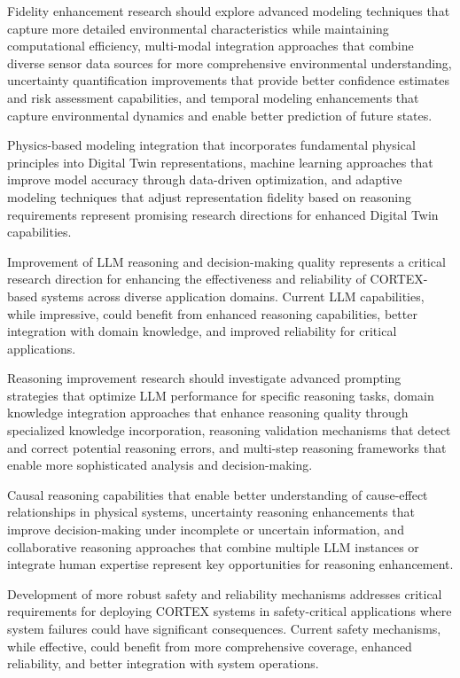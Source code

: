 Fidelity enhancement research should explore advanced modeling techniques that capture more detailed environmental characteristics while maintaining computational efficiency, multi-modal integration approaches that combine diverse sensor data sources for more comprehensive environmental understanding, uncertainty quantification improvements that provide better confidence estimates and risk assessment capabilities, and temporal modeling enhancements that capture environmental dynamics and enable better prediction of future states.

Physics-based modeling integration that incorporates fundamental physical principles into Digital Twin representations, machine learning approaches that improve model accuracy through data-driven optimization, and adaptive modeling techniques that adjust representation fidelity based on reasoning requirements represent promising research directions for enhanced Digital Twin capabilities.

Improvement of LLM reasoning and decision-making quality represents a critical research direction for enhancing the effectiveness and reliability of CORTEX-based systems across diverse application domains. Current LLM capabilities, while impressive, could benefit from enhanced reasoning capabilities, better integration with domain knowledge, and improved reliability for critical applications.

Reasoning improvement research should investigate advanced prompting strategies that optimize LLM performance for specific reasoning tasks, domain knowledge integration approaches that enhance reasoning quality through specialized knowledge incorporation, reasoning validation mechanisms that detect and correct potential reasoning errors, and multi-step reasoning frameworks that enable more sophisticated analysis and decision-making.

Causal reasoning capabilities that enable better understanding of cause-effect relationships in physical systems, uncertainty reasoning enhancements that improve decision-making under incomplete or uncertain information, and collaborative reasoning approaches that combine multiple LLM instances or integrate human expertise represent key opportunities for reasoning enhancement.

Development of more robust safety and reliability mechanisms addresses critical requirements for deploying CORTEX systems in safety-critical applications where system failures could have significant consequences. Current safety mechanisms, while effective, could benefit from more comprehensive coverage, enhanced reliability, and better integration with system operations.

